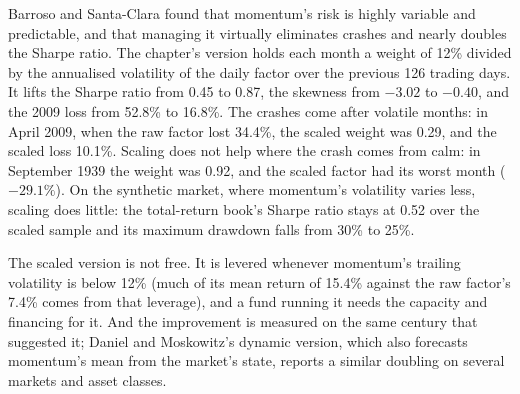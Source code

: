 Barroso and Santa-Clara found that momentum's risk is highly variable and predictable, and that managing it virtually eliminates crashes and nearly doubles
the Sharpe ratio. The chapter's version holds each month a weight of 12\% divided by the annualised volatility of the daily factor over the previous 126
trading days. It lifts the Sharpe ratio from 0.45 to 0.87, the skewness from $-3.02$ to $-0.40$, and the 2009 loss from 52.8\% to 16.8\%. The crashes
come after volatile months: in April 2009, when the raw factor lost 34.4\%, the scaled weight was 0.29, and the scaled loss 10.1\%. Scaling does not help
where the crash comes from calm: in September 1939 the weight was 0.92, and the scaled factor had its worst month ($-29.1\%$). On the synthetic market,
where momentum's volatility varies less, scaling does little: the total-return book's Sharpe ratio stays at 0.52 over the scaled sample and its maximum
drawdown falls from 30\% to 25\%.

\begin{omfigure}

\label{fig:s1:momentum:annual}
\end{omfigure}

The scaled version is not free. It is levered whenever momentum's trailing volatility is below 12\% (much of its mean return of 15.4\%
against the raw factor's 7.4\% comes from that leverage), and a fund running it needs the capacity and financing for it. And the improvement is measured on the same century that suggested it; Daniel and
Moskowitz's dynamic version, which also forecasts momentum's mean from the market's state, reports a similar doubling on several markets and asset classes.

